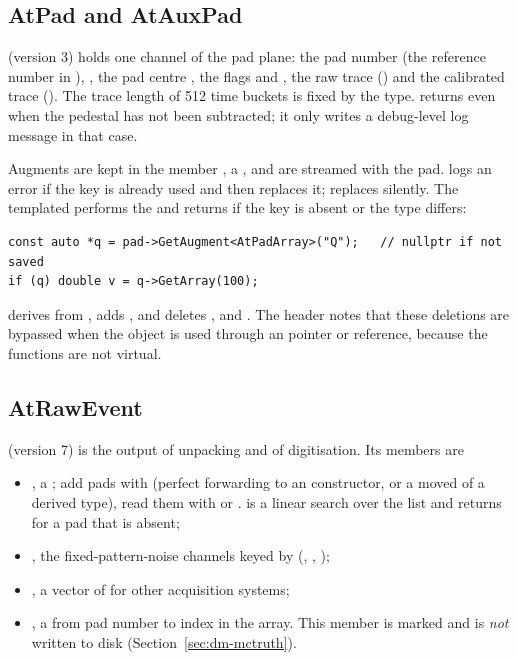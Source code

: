 \subsection{AtPad and AtAuxPad}

 (version 3) holds one channel of the pad plane: the pad number  (the
reference number in ), , the pad centre , the flags
 and , the raw trace 
() and the calibrated trace  ().
The trace length of 512 time buckets is fixed by the type.  returns  even when
the pedestal has not been subtracted; it only writes a debug-level log message in that case.

Augments are kept in the member , a
, and are streamed with the pad.  logs an error if the key is already used and then
replaces it;  replaces silently. The templated
 performs the  and returns  if the key is
absent or the type differs:

\begin{verbatim}
const auto *q = pad->GetAugment<AtPadArray>("Q");   // nullptr if not saved
if (q) double v = q->GetArray(100);
\end{verbatim}

 derives from , adds , and deletes ,
 and . The header notes that these deletions are bypassed when the
object is used through an  pointer or reference, because the functions are not virtual.

\subsection{AtRawEvent}

 (version 7) is the output of unpacking and of digitisation. Its members are
\begin{itemize}
\item {}, a ; add pads with 
  (perfect forwarding to an  constructor, or a moved  of a derived type),
  read them with  or .  is a linear search over the
  list and returns  for a pad that is absent;
\item {}, the fixed-pattern-noise channels keyed by 
  (, , );
\item {}, a vector of  for other acquisition systems;
\item {}, a  from pad number to index in
  the  array. This member is marked \code{//!} and is \emph{not} written to disk
  (Section~\ref{sec:dm-mctruth}).
\end{itemize}

